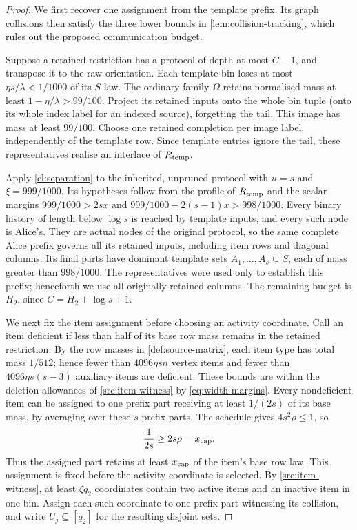 \documentclass[11pt]{article} \usepackage[utf8]{inputenc}
\theoremstyle{plain} \newtheorem{theorem}{Theorem}[section]
\theoremstyle{definition} \newaliascnt{definition}{theorem}
\begin{document}
\begin{proof}
We first recover one assignment from the template prefix. Its graph collisions
then satisfy the three lower bounds in \cref{lem:collision-tracking},
which rules out the proposed communication budget.

Suppose a retained restriction has a protocol of depth at most $C-1$,
and transpose it to the raw orientation. Each template bin loses at most
$\eta s/\lambda<1/1000$ of its $S$ law. The ordinary family $\Omega$
retains normalised mass at least $1-\eta/\lambda>99/100$.
Project its retained inputs onto the whole bin tuple (onto its whole index
label for an indexed source), forgetting the tail. This image has mass
at least $99/100$. Choose one retained completion per image label,
independently of the template row. Since template entries ignore the tail,
these representatives realise an interlace of $R_{\rm temp}$.

Apply \cref{cl:separation} to the inherited, unpruned protocol with
$u=s$ and $\xi=999/1000$. Its hypotheses follow from the profile of
$R_{\rm temp}$ and the scalar margins
$999/1000>2sx$ and $999/1000-2(s-1)x>998/1000$.
Every binary history of length below $\log s$ is reached by template
inputs, and every such node is Alice's. They are actual nodes of the
original protocol, so the same complete Alice prefix governs all its
retained inputs, including item rows and diagonal columns. Its final
parts have dominant template sets $A_1,\ldots,A_s\subseteq S$, each of
mass greater than $998/1000$.
The representatives were used only to establish this prefix; henceforth
we use all originally retained columns. The remaining budget is $H_2$,
since $C=H_2+\log s+1$.

We next fix the item assignment before choosing an activity coordinate. Call an
item deficient if less than half of its base row mass remains in the retained
restriction. By the row masses in \cref{def:source-matrix}, each item type has
total mass \(1/512\); hence fewer than \(4096\eta sn\) vertex items and fewer
than \(4096\eta s(s-3)\) auxiliary items are deficient. These bounds are within
the deletion allowances of \cref{src:item-witness} by \eqref{eq:width-margins}. Every nondeficient item can be assigned to
one prefix part receiving at least \(1/(2s)\) of its base mass, by averaging
over these \(s\) prefix parts. The schedule gives
\(4s^2\rho\le1\), so
\[
\frac1{2s}\ge2s\rho=x_{\rm cap}.
\]
Thus the assigned part retains at least \(x_{\rm cap}\) of the item's base row
law. This assignment is fixed before the activity coordinate is selected. By
\cref{src:item-witness}, at least \(\zeta q_2\) coordinates contain two active
items and an inactive item in one bin. Assign each such coordinate to one prefix
part witnessing its collision, and write \(U_j\subseteq[q_2]\) for the resulting
disjoint sets.


\end{proof}
\end{document}
